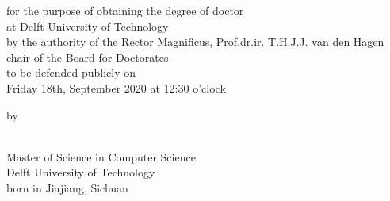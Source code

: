 \begin{small}

\begin{center}for the purpose of obtaining the degree of doctor\\
\vspace{1mm}
at Delft University of Technology\\
\vspace{1mm}
by the authority of the Rector Magnificus, Prof.dr.ir. T.H.J.J. van den Hagen\\
\vspace{1mm}
chair of the Board for Doctorates\\
\vspace{1mm}
to be defended publicly on\\
\vspace{1mm}
Friday 18th, September 2020 at 12:30 o'clock
\vspace{1mm}
\vspace{10mm} %

by

\vspace{10mm}
\textbf{\theauthor}\\
\vspace{1mm}
Master of Science in Computer Science\\
\vspace{1mm}
Delft University of Technology\\
\vspace{1mm}
born in Jiajiang, Sichuan
\vspace{1mm}
\end{center}

\end{small}


